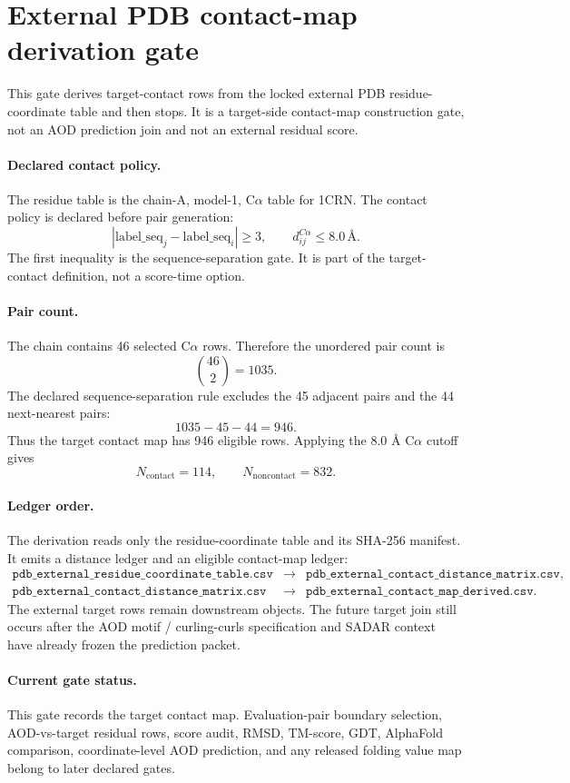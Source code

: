 \section{External PDB contact-map derivation gate}

This gate derives target-contact rows from the locked external PDB residue-coordinate table and then stops.  It is a target-side contact-map construction gate, not an AOD prediction join and not an external residual score.

\paragraph{Declared contact policy.}
The residue table is the chain-A, model-1, C$\alpha$ table for 1CRN.  The contact policy is declared before pair generation:
\[
  |\mathrm{label\_seq}_j-\mathrm{label\_seq}_i|\geq 3,
  \qquad
  d_{ij}^{C\alpha}\leq 8.0\,\text{\AA}.
\]
The first inequality is the sequence-separation gate.  It is part of the target-contact definition, not a score-time option.

\paragraph{Pair count.}
The chain contains 46 selected C$\alpha$ rows.  Therefore the unordered pair count is
\[
  \binom{46}{2}=1035.
\]
The declared sequence-separation rule excludes the 45 adjacent pairs and the 44 next-nearest pairs:
\[
  1035-45-44=946.
\]
Thus the target contact map has 946 eligible rows.  Applying the 8.0 \AA{} C$\alpha$ cutoff gives
\[
  N_{\mathrm{contact}}=114,
  \qquad
  N_{\mathrm{noncontact}}=832.
\]

\paragraph{Ledger order.}
The derivation reads only the residue-coordinate table and its SHA-256 manifest.  It emits a distance ledger and an eligible contact-map ledger:
\[
\begin{array}{rcl}
\texttt{pdb\_external\_residue\_coordinate\_table.csv} & \longrightarrow &
\texttt{pdb\_external\_contact\_distance\_matrix.csv},\\
\texttt{pdb\_external\_contact\_distance\_matrix.csv} & \longrightarrow &
\texttt{pdb\_external\_contact\_map\_derived.csv}.
\end{array}
\]
The external target rows remain downstream objects.  The future target join still occurs after the AOD motif / curling-curls specification and SADAR context have already frozen the prediction packet.

\paragraph{Current gate status.}
This gate records the target contact map.  Evaluation-pair boundary selection, AOD-vs-target residual rows, score audit, RMSD, TM-score, GDT, AlphaFold comparison, coordinate-level AOD prediction, and any released folding value map belong to later declared gates.
